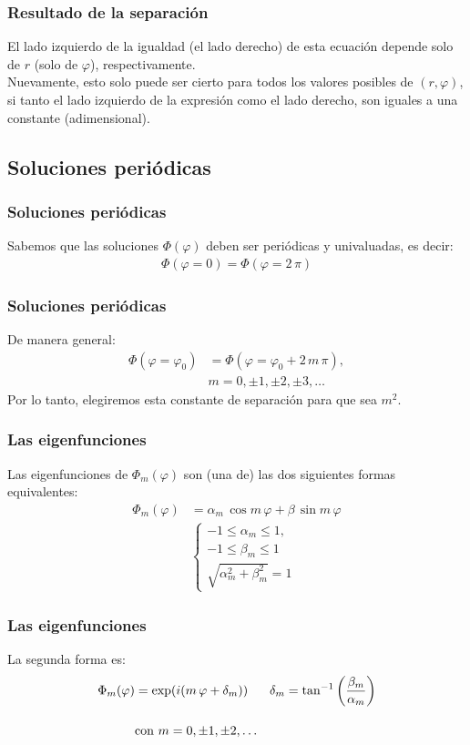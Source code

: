 \documentclass[12pt]{beamer}
\begin{document}
\begin{frame}
\frametitle{Resultado de la separación}
El lado izquierdo de la igualdad (el lado derecho) de esta ecuación depende solo de $r$ (solo de $\varphi$), respectivamente.
\\
\bigskip
\pause
Nuevamente, esto solo puede ser cierto para todos los valores posibles de $(r, \varphi)$, si tanto el lado izquierdo de la expresión como el lado derecho, son iguales a una constante (adimensional).
\end{frame}

\subsection{Soluciones periódicas}

\begin{frame}
\frametitle{Soluciones periódicas}
Sabemos que las soluciones $\Phi(\varphi)$ deben ser periódicas y univaluadas, es decir:
\pause 
\begin{align*}
\Phi (\varphi = 0) = \Phi (\varphi = 2 \, \pi)
\end{align*}
\end{frame}
\begin{frame}
\frametitle{Soluciones periódicas}
De manera general:
\pause
\begin{align*}
\Phi (\varphi = \varphi_{0}) &= \Phi (\varphi = \varphi_{0} + 2 \, m \, \pi), \\[0.em]
&m = 0, \pm 1, \pm 2,\pm 3, \ldots
\end{align*}
\pause
Por lo tanto, elegiremos esta constante de separación para que sea $m^{2}$.
\end{frame}
\begin{frame}
\frametitle{Las eigenfunciones}
Las eigenfunciones de $\Phi_{m} (\varphi)$ son (una de) las dos siguientes formas equivalentes:
\pause 
\begin{align*}
\Phi_{m} (\varphi) &= \alpha_{m} \, \cos m \, \varphi + \beta \, \sin m \, \varphi \\[1em]
&\begin{cases}
-1 \leq \alpha_{m} \leq 1, \\
-1 \leq \beta_{m} \leq 1 \\
\sqrt{\alpha_{m}^{2} + \beta_{m}^{2}} = 1
\end{cases}
\end{align*}
\end{frame}
\begin{frame}
\frametitle{Las eigenfunciones}
La segunda forma es:
\pause
\begin{align*}
\Phi_{m} (\varphi) &= \exp(i (m \, \varphi + \delta_{m})) \hspace{0.6cm} \delta_{m} = \tan^{-1} \left( \dfrac{\beta_{m}}{\alpha_{m}}\right) \\[1em]
&\mbox{con } m = 0, \pm 1, \pm 2, \ldots
\end{align*}
\end{frame}
\end{document}
